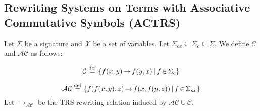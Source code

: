 \subsection{Rewriting Systems on Terms with Associative Commutative Symbols (ACTRS)}







 
\begin{definition}
  \label{def:trs:ac}
  Let $\Sigma$ be a signature and $\mathcal{X}$ be a set of variables.
  Let $\Sigma_{ac} \mathop{\subseteq} \Sigma_{c} \mathop{\subseteq} \Sigma$. We define $\mathcal{C}$ and $\mathcal{AC}$ as follows:
  
  $$\mathcal{C} \overset{\operatorname{def}}{=} \{f(x,y) \mathop{\to} f(y,x) \mathop{\mid} f \mathop{\in} \Sigma_{c} \}$$
  
  $$\mathcal{AC} \overset{\operatorname{def}}{=} 
           \{f(f(x,y),z) \mathop{\to} f(x,f(y,z)) \mathop{\mid} f \mathop{\in} \Sigma_{ac} \}$$
  Let $ \mathop{\to} _\mathcal{AC}$ be the TRS rewriting relation induced by $\mathcal{AC} \mathop{\cup} \mathcal{C}$.
\end{definition}

